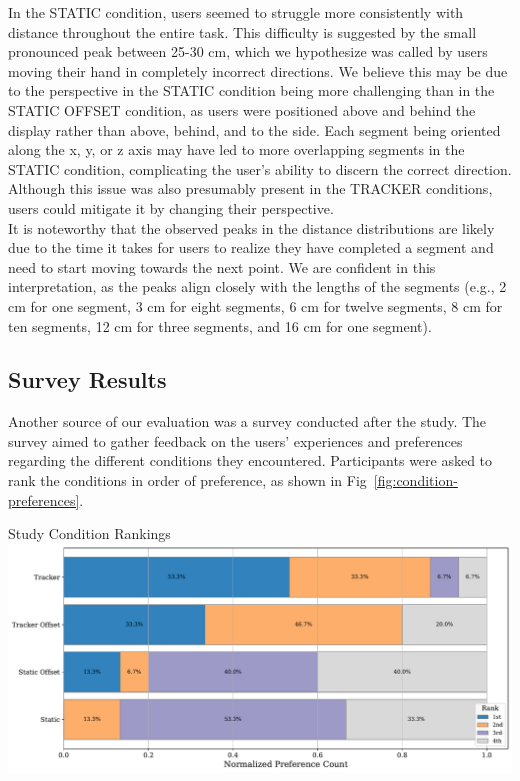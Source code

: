 In the STATIC condition, users seemed to struggle more consistently with distance throughout the entire task. This difficulty is suggested by the small pronounced peak between 25-30 cm, which we hypothesize was called by users moving their hand in completely incorrect directions. We believe this may be due to the perspective in the STATIC condition being more challenging than in the STATIC OFFSET condition, as users were positioned above and behind the display rather than above, behind, and to the side. Each segment being oriented along the x, y, or z axis may have led to more overlapping segments in the STATIC condition, complicating the user's ability to discern the correct direction. Although this issue was also presumably present in the TRACKER conditions, users could mitigate it by changing their perspective. \\

It is noteworthy that the observed peaks in the distance distributions are likely due to the time it takes for users to realize they have completed a segment and need to start moving towards the next point. We are confident in this interpretation, as the peaks align closely with the lengths of the segments (e.g., 2 cm for one segment, 3 cm for eight segments, 6 cm for twelve segments, 8 cm for ten segments, 12 cm for three segments, and 16 cm for one segment).

\subsection{Survey Results}

Another source of our evaluation was a survey conducted after the study. The survey aimed to gather feedback on the users' experiences and preferences regarding the different conditions they encountered. Participants were asked to rank the conditions in order of preference, as shown in Fig~\ref{fig:condition-preferences}. \\

\begin{figureBox}[label={fig:condition-preferences}, width=1.0\linewidth]{Study Condition Rankings}
    \includegraphics[width = 1.0\linewidth]{./evaluation/figures/survery/preferences.pdf}
\end{figureBox}

